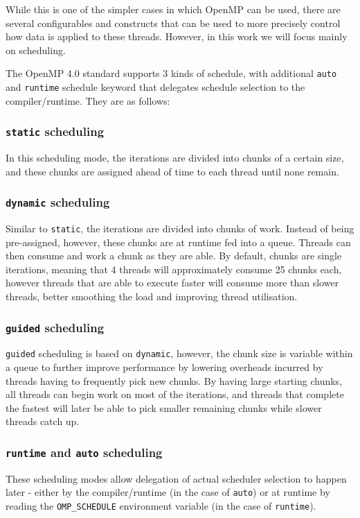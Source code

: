\documentclass[a4paper]{article}
\begin{document}
        While this is one of the simpler cases in which OpenMP can be used, there are several configurables and
        constructs that can be used to more precisely control how data is applied to these threads. However, in this
        work we will focus mainly on scheduling.

        The OpenMP 4.0 standard \cite{OpenMP40Std} supports 3 kinds of schedule, with additional \texttt{auto} and
        \texttt{runtime} schedule keyword that delegates schedule selection to the compiler/runtime. They are as
        follows:

            \subsubsection{\texttt{static} scheduling}
            In this scheduling mode, the iterations are divided into chunks of a certain size, and these chunks are
            assigned ahead of time to each thread until none remain.

            \subsubsection{\texttt{dynamic} scheduling}
            Similar to \texttt{static}, the iterations are divided into chunks of work. Instead of being pre-assigned,
            however, these chunks are at runtime fed into a queue. Threads can then consume and work a chunk as they
            are able. By default, chunks are single iterations, meaning that 4 threads will approximately consume 25
            chunks each, however threads that are able to execute faster will consume more than slower threads,
            better smoothing the load and improving thread utilisation.

            \subsubsection{\texttt{guided} scheduling}
            \texttt{guided} scheduling is based on \texttt{dynamic}, however, the chunk size is variable within a queue
            to further improve performance by lowering overheads incurred by threads having to frequently pick new
            chunks. By having large starting chunks, all threads can begin work on most of the iterations, and threads
            that complete the fastest will later be able to pick smaller remaining chunks while slower threads catch
            up.

            \subsubsection{\texttt{runtime} and \texttt{auto} scheduling}
            These scheduling modes allow delegation of actual scheduler selection to happen later - either by the
            compiler/runtime (in the case of \texttt{auto}) or at runtime by reading the \texttt{OMP\_SCHEDULE} 
            environment variable (in the case of \texttt{runtime}).
\end{document}
